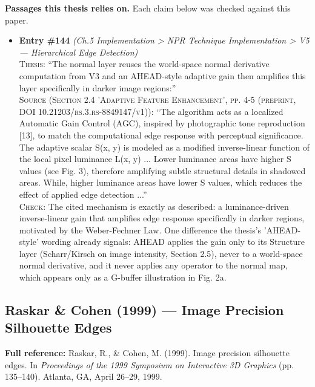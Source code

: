 \documentclass[11pt, a4paper]{article}
\begin{document}
\textbf{Passages this thesis relies on.} Each claim below was checked against this paper.
\begin{itemize}[leftmargin=1.2em,itemsep=4pt]
\item \textbf{Entry \#144} \textit{(Ch.5 Implementation > NPR Technique Implementation > V5 — Hierarchical Edge Detection)}\\
\textsc{Thesis:} ``The normal layer reuses the world-space normal derivative computation from V3 and an AHEAD-style adaptive gain then amplifies this layer specifically in darker image regions:''\\
\textsc{Source (Section 2.4 'Adaptive Feature Enhancement', pp. 4-5 (preprint, DOI 10.21203/rs.3.rs-8849147/v1)):} ``The algorithm acts as a localized Automatic Gain Control (AGC), inspired by photographic tone reproduction [13], to match the computational edge response with perceptual significance. The adaptive scalar S(x, y) is modeled as a modified inverse-linear function of the local pixel luminance L(x, y) ... Lower luminance areas have higher S values (see Fig. 3), therefore amplifying subtle structural details in shadowed areas. While, higher luminance areas have lower S values, which reduces the effect of applied edge detection ...''\\
\textsc{Check:} The cited mechanism is exactly as described: a luminance-driven inverse-linear gain that amplifies edge response specifically in darker regions, motivated by the Weber-Fechner Law. One difference the thesis's 'AHEAD-style' wording already signals: AHEAD applies the gain only to its Structure layer (Scharr/Kirsch on image intensity, Section 2.5), never to a world-space normal derivative, and it never applies any operator to the normal map, which appears only as a G-buffer illustration in Fig. 2a.
\end{itemize}

\vspace{8pt}
\subsection{Raskar \& Cohen (1999) --- Image Precision Silhouette Edges}

\begin{refbox}
\textbf{Full reference:} Raskar, R., \& Cohen, M. (1999). Image precision silhouette edges. In \textit{Proceedings of the 1999 Symposium on Interactive 3D Graphics} (pp. 135--140). Atlanta, GA, April 26--29, 1999.
\end{refbox}
\end{document}
